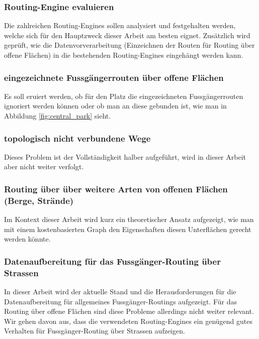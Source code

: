 \subsubsection{Routing-Engine evaluieren}
\label{target:Routing-Enginge evaluieren}
Die zahlreichen Routing-Engines sollen analysiert und festgehalten werden, welche sich für den Hauptzweck dieser Arbeit am besten eignet. Zusätzlich wird geprüft, wie die Datenvorverarbeitung (Einzeichnen der Routen für Routing über offene Flächen) in die bestehenden Routing-Engines eingehängt werden kann.

\subsubsection{eingezeichnete Fussgängerrouten über offene Flächen}
\label{target:eingezeichnete Fussgängerrouten über offene Flächen}
Es soll eruiert werden, ob für den Platz die eingezeichneten Fussgängerrouten ignoriert werden können oder ob man an diese gebunden ist, wie man in Abbildung \ref{fig:central_park} sieht.

\subsubsection{topologisch nicht verbundene Wege}
\label{target:topologisch nicht verbundene Wege}
Dieses Problem ist der Vollständigkeit halber aufgeführt, wird in dieser Arbeit aber nicht weiter verfolgt.

\subsubsection{Routing über über weitere Arten von offenen Flächen (Berge, Strände)}
\label{target:Routing über über weitere Arten von offenen Flächen (Berge, Strände)}
Im Kontext dieser Arbeit wird kurz ein theoretischer Ansatz aufgezeigt, wie man mit einem kostenbasierten Graph den Eigenschaften diesen Unterflächen gerecht werden könnte.

\subsubsection{Datenaufbereitung für das Fussgänger-Routing über Strassen}
\label{target:Datenaufbereitung für das Fussgänger-Routing über Strassen}

In dieser Arbeit wird der aktuelle Stand und die Herausforderungen für die Datenaufbereitung für allgemeines Fussgänger-Routings aufgezeigt. Für das Routing über offene Flächen sind diese Probleme allerdings nicht weiter relevant. Wir gehen davon aus, dass die verwendeten Routing-Engines ein genügend gutes Verhalten für Fussgänger-Routing über Strassen aufzeigen.

